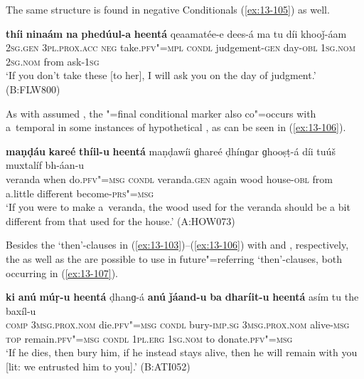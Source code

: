 The same structure is found in negative Conditionals (\ref{ex:13-105}) as well.

\begin{exe}
\ex
\label{ex:13-105}
\gll \textbf{thíi} \textbf{ninaám} \textbf{na} \textbf{phedúul-a} \textbf{heentá}  qeaamatée-e dees-á ma tu díi khooǰ-áam \\
\textsc{2sg.gen} \textsc{3pl.prox.acc} \textsc{neg} take.\textsc{pfv"=mpl} \textsc{condl} judgement-\textsc{gen} day-\textsc{obl} \textsc{1sg.nom} \textsc{2sg.nom} from ask-\textsc{1sg}  \\
\glt `If you don't take these [to her], I will ask you on the day of judgment.' (B:FLW800) 
\end{exe}

As with assumed , the "=final conditional marker also co"=occurs with a~temporal  in some instances of hypothetical , as can be seen in (\ref{ex:13-106}). 

\begin{exe}
\ex
\label{ex:13-106}
\gll \textbf{maṇḍáu} \textbf{kareé} \textbf{thíil-u} \textbf{heentá} maṇḍawíi ɡhareé ḍhínɡar ɡhooṣṭ-á díi tuúš muxtalíf bh-áan-u  \\
veranda when do.\textsc{pfv"=msg} \textsc{condl} veranda.\textsc{gen} again wood house-\textsc{obl} from a.little different become-\textsc{prs"=msg} \\
\glt `If you were to make a~veranda, the wood used for the veranda should be a bit different from that used for the house.' (A:HOW073) 
\end{exe}

Besides the `then'-clauses in (\ref{ex:13-103})--(\ref{ex:13-106}) with  and , respectively, the  as well as the  are possible to use in future"=referring `then'-clauses, both occurring in (\ref{ex:13-107}).

\begin{exe}
\ex
\label{ex:13-107}
\gll \textbf{ki} \textbf{anú} \textbf{múṛ-u} \textbf{heentá} ḍhanɡ-á  \textbf{anú} \textbf{ǰáand-u} \textbf{ba} \textbf{dharíit-u} \textbf{heentá} asím tu the baxíl-u\\
\textsc{comp} \textsc{3msg.prox.nom} die.\textsc{pfv"=msg} \textsc{condl} bury-\textsc{imp.sg}  \textsc{3msg.prox.nom} alive-\textsc{msg} \textsc{top} remain.\textsc{pfv"=msg} \textsc{condl}  \textsc{1pl.erg} \textsc{1sg.nom} to donate.\textsc{pfv"=msg}\\
\glt `If he dies, then bury him, if he instead stays alive, then he will remain with you [lit: we entrusted him to you].' (B:ATI052) 
\end{exe}

